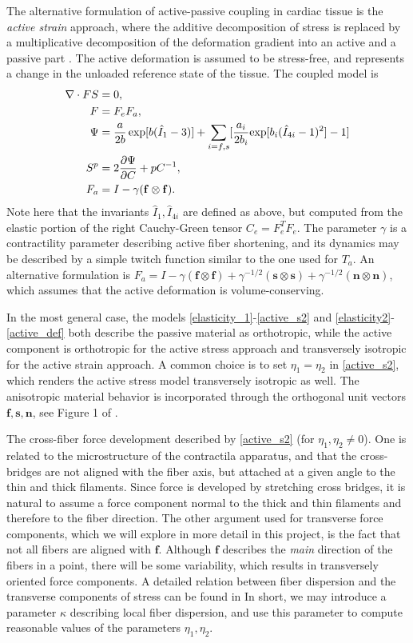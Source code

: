 \documentclass[epsfig,11pt]{article}
\newcommand{\f}{\mathbf f}
\newcommand{\s}{\mathbf s}
\newcommand{\n}{\mathbf n}
\begin{document}
\begin{description}
The alternative formulation of active-passive coupling in cardiac tissue is the \emph{active strain} approach, where the additive decomposition of stress is replaced by a multiplicative decomposition of the deformation gradient into an active and a passive part \cite{Ambrosi:2011fb}. The active deformation is assumed to be stress-free, and represents a change in the unloaded reference state of the tissue. The coupled model is
\begin{align}
\nabla\cdot FS &= 0,  \label{elasticity_2} \\
F  &= F_eF_a,  \label{def_split} \\
\Psi &= \frac{a}{2b} \exp[b(\hat{I}_1-3)] + \sum_{i=f,s} [\frac{a_i}{2b_i}{\exp[b_i(\hat{I}_{4i}-1)^2]-1]} \label{strain_energy2} \\
S^p &= 2{\partial\Psi\over\partial C}+pC^{-1}, \\
F_a &= I-\gamma (\f \otimes \f) . \label{active_def}
\end{align}
Note here that the invariants $\hat{I}_1,\hat{I}_{4i}$ are defined as above, but computed from the elastic portion of the 
right Cauchy-Green tensor $C_e= F_e^TF_e$. The parameter $\gamma$ is a contractility parameter describing active fiber shortening, and its dynamics may be described by a simple twitch function similar to the one used for $T_a$. An alternative formulation is $F_a =  I-\gamma (\f \otimes \f) +\gamma^{-1/2} (\s\otimes\s) + \gamma^{-1/2}(\n\otimes\n)$, which assumes that the active deformation is volume-conserving.

In the most general case, the models \eqref{elasticity_1}-\eqref{active_s2} and \eqref{elasticity2}-\eqref{active_def} both describe the passive material as orthotropic, while the active component is orthotropic for the active stress approach and transversely isotropic for the active strain approach. A common choice is to set $\eta_1=\eta_2$ in \eqref{active_s2}, which 
renders the active stress model transversely isotropic as well. The anisotropic material behavior is incorporated through the orthogonal unit vectors $\f,\s,\n$, see Figure 1 of \cite{Holzapfel:2009bb}. 

The cross-fiber force development described by \eqref{active_s2} (for $\eta_1,\eta_2 \neq 0$). One is related to the microstructure of the contractila apparatus, and that the cross-bridges are not aligned with the fiber axis, but attached at a given angle to the thin and thick filaments.  Since force is developed by stretching cross bridges, it is natural to assume a force component normal to the thick and thin filaments and therefore to the fiber direction. The other argument used for transverse force components, which we will explore in more detail in this project, is the fact that not all fibers are aligned with $\f$. Although $\f$ describes the \emph{main} direction of the fibers in a point, there will be some variability, which results in transversely oriented force components. A detailed relation between fiber dispersion and the transverse components of stress can be found in \cite{Gasser:2006kd} In short, we may introduce a parameter $\kappa$ describing local fiber dispersion, and use this parameter to compute reasonable values of the parameters $\eta_1, \eta_2$.


\end{description}
\end{document}
